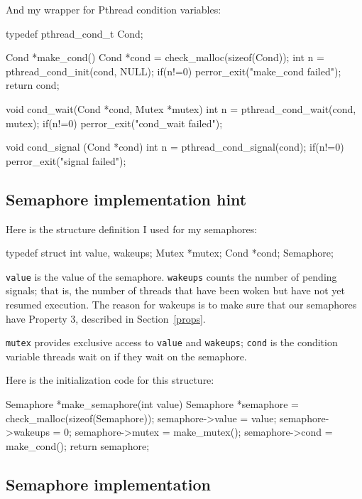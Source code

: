 \documentclass{book}
\begin{document}
And my wrapper for Pthread condition variables:

\begin{unbreakable}[title={}]{}
typedef pthread_cond_t Cond;

Cond *make_cond() {
 Cond *cond = check_malloc(sizeof(Cond)); 
 int n = pthread_cond_init(cond, NULL);
 if(n!=0) perror_exit("make_cond failed");
 return cond;
}

void cond_wait(Cond *cond, Mutex *mutex) {
 int n = pthread_cond_wait(cond, mutex);
 if(n!=0) perror_exit("cond_wait failed");
}

void cond_signal (Cond *cond) {
 int n = pthread_cond_signal(cond);
 if(n!=0) perror_exit("signal failed");
}
\end{unbreakable}




\subsection{Semaphore implementation hint}

Here is the structure definition I used for my semaphores:


\begin{unbreakable}[title={}]{}
typedef struct {
  int value, wakeups;
  Mutex *mutex;
  Cond *cond;
} Semaphore;
\end{unbreakable}

{\tt value} is the value of the semaphore.  {\tt wakeups} counts
the number of pending signals; that is, the number of threads
that have been woken but have not yet resumed execution.  The reason
for wakeups is to make sure that our semaphores have
Property 3, described in Section~\ref{props}.

{\tt mutex} provides exclusive access to {\tt value} and
    {\tt wakeups}; {\tt cond} is the condition variable threads
wait on if they wait on the semaphore.

Here is the initialization code for this structure:

\pagebreak
\begin{unbreakable}[title={}]{}
Semaphore *make_semaphore(int value) {
 Semaphore *semaphore = 
  check_malloc(sizeof(Semaphore));
 semaphore->value = value;
 semaphore->wakeups = 0;
 semaphore->mutex = make_mutex();
 semaphore->cond = make_cond();
 return semaphore;
}
\end{unbreakable}



\subsection{Semaphore implementation}
\end{document}
